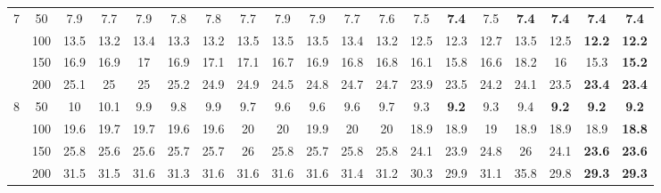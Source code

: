 \begin{table}[htbp]
\begin{adjustbox}{angle=90}
{\begin{tabular}{|c|c|c|c|c|c|c|c|c|c|c|c|c|c|c|c|c|c|c|}
    7 & 50 & 7.9 & 7.7 & 7.9 & 7.8 & 7.8 & 7.7 & 7.9 & 7.9 & 7.7 & 7.6 & 7.5 & \textbf{7.4} & 7.5 & \textbf{7.4} & \textbf{7.4} & \textbf{7.4} & \textbf{7.4} \\ 
     & 100 & 13.5 & 13.2 & 13.4 & 13.3 & 13.2 & 13.5 & 13.5 & 13.5 & 13.4 & 13.2 & 12.5 & 12.3 & 12.7 & 13.5 & 12.5 & \textbf{12.2} & \textbf{12.2} \\ 
     & 150 & 16.9 & 16.9 & 17 & 16.9 & 17.1 & 17.1 & 16.7 & 16.9 & 16.8 & 16.8 & 16.1 & 15.8 & 16.6 & 18.2 & 16 & 15.3 & \textbf{15.2} \\ 
     & 200 & 25.1 & 25 & 25 & 25.2 & 24.9 & 24.9 & 24.5 & 24.8 & 24.7 & 24.7 & 23.9 & 23.5 & 24.2 & 24.1 & 23.5 & \textbf{23.4} & \textbf{23.4} \\ \hline
    8 & 50 & 10 & 10.1 & 9.9 & 9.8 & 9.9 & 9.7 & 9.6 & 9.6 & 9.6 & 9.7 & 9.3 & \textbf{9.2} & 9.3 & 9.4 & \textbf{9.2} & \textbf{9.2} & \textbf{9.2} \\ 
     & 100 & 19.6 & 19.7 & 19.7 & 19.6 & 19.6 & 20 & 20 & 19.9 & 20 & 20 & 18.9 & 18.9 & 19 & 18.9 & 18.9 & 18.9 & \textbf{18.8} \\ 
     & 150 & 25.8 & 25.6 & 25.6 & 25.7 & 25.7 & 26 & 25.8 & 25.7 & 25.8 & 25.8 & 24.1 & 23.9 & 24.8 & 26 & 24.1 & \textbf{23.6} & \textbf{23.6} \\ 
     & 200 & 31.5 & 31.5 & 31.6 & 31.3 & 31.6 & 31.6 & 31.6 & 31.6 & 31.4 & 31.2 & 30.3 & 29.9 & 31.1 & 35.8 & 29.8 & \textbf{29.3} & \textbf{29.3} \\ \hline
    \end{tabular}}
    \end{adjustbox}
    \label{exp:literature_all_bins}
    \end{table}
    